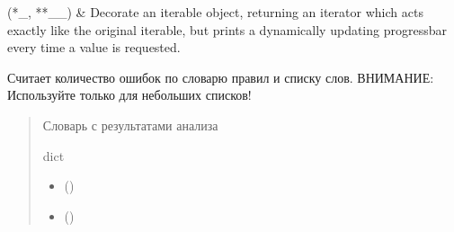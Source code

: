 \documentclass[a4paper,11pt,russian,openany,oneside]{sphinxmanual}
\begin{document}
\begin{savenotes}\sphinxattablestart
\sphinxthistablewithglobalstyle
\sphinxthistablewithnovlinesstyle
\centering
\begin{tabulary}{\linewidth}[t]{}
\sphinxtoprule
\sphinxtableatstartofbodyhook
\sphinxAtStartPar
{}(*\_, **\_\_)
&
\sphinxAtStartPar
Decorate an iterable object, returning an iterator which acts exactly like the original iterable, but prints a dynamically updating progressbar every time a value is requested.
\\
\sphinxbottomrule
\end{tabulary}
\sphinxtableafterendhook\par
\sphinxattableend\end{savenotes}

\begin{savenotes}\begin{fulllineitems}
\label{\detokenize{_autosummary/processing_module.calculate_data:processing_module.calculate_data.make_processing}}
\pysigstartsignatures
\pysiglinewithargsret
{}
{\sphinxparamcomma {}}
{}
\pysigstopsignatures
\sphinxAtStartPar
Считает количество ошибок по словарю правил и списку слов.
ВНИМАНИЕ: Используйте только для небольших списков!
\begin{quote}\begin{description}
\sphinxAtStartPar
Словарь с результатами анализа

\sphinxAtStartPar
dict

\begin{itemize}
\item {} 
\sphinxAtStartPar
{} ()

\item {} 
\sphinxAtStartPar
{} ()

\end{itemize}

\end{description}\end{quote}

\end{fulllineitems}\end{savenotes}
\end{document}

